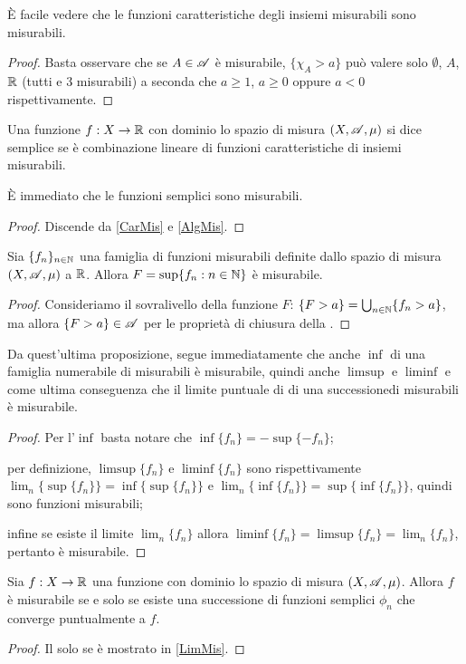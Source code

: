 \begin{remark}
	\label{CarMis}
	È facile vedere che le funzioni caratteristiche degli insiemi misurabili sono misurabili.
\end{remark}
\begin{proof}
	Basta osservare che se $A\in \mathscr A$ è misurabile, $\{ \chi_A > a\}$ può valere solo $\emptyset$, $A$, $\mathbb R$ (tutti e 3 misurabili) a seconda che
	$a\geq 1$, $a\geq 0$ oppure $a < 0$ rispettivamente.
\end{proof}

\begin{definition}
	Una funzione $f:X \rightarrow \mathbb R$ con dominio lo spazio di misura $(X,\mathscr A,\mu)$ si dice semplice se è combinazione lineare di
	funzioni caratteristiche di insiemi misurabili.
\end{definition}
\begin{remark}
	È immediato che le funzioni semplici sono misurabili.
\end{remark}
\begin{proof}
	Discende da \cref{CarMis} e \cref{AlgMis}.
\end{proof}


\begin{proposition}
	Sia $\{f_n\}_{n\in \mathbb N}$ una famiglia di funzioni misurabili definite dallo spazio di misura $(X,\mathscr A,\mu)$ a $\mathbb R$.
	Allora $F=\sup\{f_n:n\in \mathbb N\}$ è misurabile.
\end{proposition}
\begin{proof}
	Consideriamo il sovralivello della funzione $F$: $\{F>a\}=\bigcup_{n\in \mathbb N}\{f_n>a\}$, ma allora $\{F>a\}\in \mathscr A$ per le proprietà 
	di chiusura della \sigalg.
\end{proof}

\begin{remark}
	\label{LimMis}
	Da quest'ultima proposizione, segue immediatamente che anche $\inf$ di una famiglia numerabile di misurabili è misurabile,
	quindi anche $\limsup$ e $\liminf$ e come ultima conseguenza che il limite puntuale di di una successionedi misurabili è misurabile.
\end{remark}
\begin{proof}
	Per l'$\inf$ basta notare che $\inf\{f_n\}=-\sup\{-f_n\}$;
	
	per definizione, $\limsup\{f_n\}$ e $\liminf\{f_n\}$ sono rispettivamente $\lim_n\{\sup\{f_n\}\}=\inf\{\sup\{f_n\}\}$ e
	$\lim_n\{\inf\{f_n\}\}=\sup\{\inf\{f_n\}\}$, quindi sono funzioni misurabili;
	
	infine se esiste il limite $\lim_n\{f_n\}$ allora $\liminf\{f_n\}=\limsup\{f_n\}=\lim_n\{f_n\}$, pertanto è misurabile.
\end{proof}

\begin{proposition}
	Sia $f:X \rightarrow \mathbb R$ una funzione con dominio lo spazio di misura $(X,\mathscr A,\mu)$.
	Allora $f$ è misurabile se e solo se esiste una successione di funzioni semplici $\phi_n$ che converge puntualmente a $f$.
\end{proposition}
\begin{proof}
	Il solo se è mostrato in \cref{LimMis}.
\end{proof}

